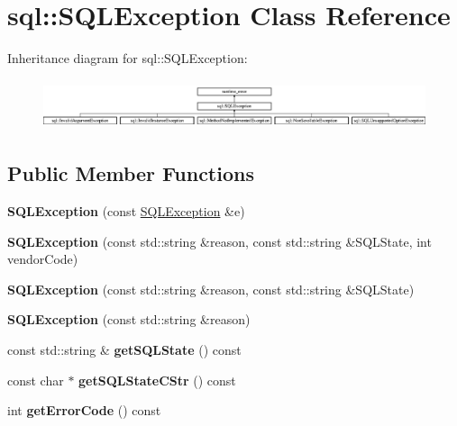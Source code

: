 \hypertarget{classsql_1_1_s_q_l_exception}{}\section{sql\+:\+:S\+Q\+L\+Exception Class Reference}
\label{classsql_1_1_s_q_l_exception}
Inheritance diagram for sql\+:\+:S\+Q\+L\+Exception\+:\begin{figure}[H]
\begin{center}
\leavevmode
\includegraphics[height=1.467249cm]{classsql_1_1_s_q_l_exception}
\end{center}
\end{figure}
\subsection*{Public Member Functions}
\begin{DoxyCompactItemize}
\item 
\hypertarget{classsql_1_1_s_q_l_exception_afd6b5c61f3fd1608d88c77ce23553296}{}\label{classsql_1_1_s_q_l_exception_afd6b5c61f3fd1608d88c77ce23553296} 
{\bfseries S\+Q\+L\+Exception} (const \hyperlink{classsql_1_1_s_q_l_exception}{S\+Q\+L\+Exception} \&e)
\item 
\hypertarget{classsql_1_1_s_q_l_exception_aa35841915a5b1f5b71a6242e42015393}{}\label{classsql_1_1_s_q_l_exception_aa35841915a5b1f5b71a6242e42015393} 
{\bfseries S\+Q\+L\+Exception} (const std\+::string \&reason, const std\+::string \&S\+Q\+L\+State, int vendor\+Code)
\item 
\hypertarget{classsql_1_1_s_q_l_exception_a6d039899538ac3dbfa45a6863535e9c2}{}\label{classsql_1_1_s_q_l_exception_a6d039899538ac3dbfa45a6863535e9c2} 
{\bfseries S\+Q\+L\+Exception} (const std\+::string \&reason, const std\+::string \&S\+Q\+L\+State)
\item 
\hypertarget{classsql_1_1_s_q_l_exception_acdddee0d584c9f9e9cd50a926366fa94}{}\label{classsql_1_1_s_q_l_exception_acdddee0d584c9f9e9cd50a926366fa94} 
{\bfseries S\+Q\+L\+Exception} (const std\+::string \&reason)
\item 
\hypertarget{classsql_1_1_s_q_l_exception_a47de7e92cd45d5829bf44eefd24c4b93}{}\label{classsql_1_1_s_q_l_exception_a47de7e92cd45d5829bf44eefd24c4b93} 
const std\+::string \& {\bfseries get\+S\+Q\+L\+State} () const
\item 
\hypertarget{classsql_1_1_s_q_l_exception_a803dd506d802e196ad4af4f9839f00ed}{}\label{classsql_1_1_s_q_l_exception_a803dd506d802e196ad4af4f9839f00ed} 
const char $\ast$ {\bfseries get\+S\+Q\+L\+State\+C\+Str} () const
\item 
\hypertarget{classsql_1_1_s_q_l_exception_a3789c7cdd37233dae5fcb8cff387b4df}{}\label{classsql_1_1_s_q_l_exception_a3789c7cdd37233dae5fcb8cff387b4df} 
int {\bfseries get\+Error\+Code} () const
\end{DoxyCompactItemize}
